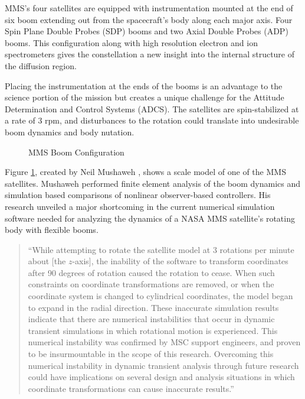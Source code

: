MMS's four satellites are equipped with instrumentation mounted at the end of six boom extending out from the spacecraft's body along each major axis.  Four Spin Plane Double Probes (SDP) booms and two Axial Double Probes (ADP) booms.  This configuration along with high resolution electron and ion spectrometers gives the constellation a new insight into the internal structure of the diffusion region.

Placing the instrumentation at the ends of the booms is an advantage to the science portion of the mission but creates a unique challenge for the Attitude Determination and Control Systems (ADCS).  The satellites are spin-stabilized at a rate of 3 rpm, and disturbances to the rotation could translate into undesirable boom dynamics and body nutation.

\begin{figure}[H]
  \centerline{}
  \caption{MMS Boom Configuration \cite{mushawehthesis}}
  \label{fig:booms}
\end{figure}

Figure \ref{fig:booms}, created by Neil Mushaweh \cite{mushawehthesis}, shows a scale model of one of the MMS satellites.  Mushaweh performed finite element analysis of the boom dynamics and simulation based comparisons of nonlinear observer-based controllers.  His research unveiled a major shortcoming in the current numerical simulation software needed for analyzing the dynamics of a NASA MMS satellite's rotating body with flexible booms.

\begin{quote}{``While attempting to rotate the satellite model at 3 rotations per minute about [the $z$-axis], the inability of the software to transform coordinates after 90 degrees of rotation caused the rotation to cease. When such constraints on coordinate transformations are removed, or when the coordinate system is changed to cylindrical coordinates, the model began to expand in the radial direction. These inaccurate simulation results indicate that there are numerical instabilities that occur in dynamic transient simulations in which rotational motion is experienced. This numerical instability was confirmed by MSC support engineers, and proven to be insurmountable in the scope of this research. Overcoming this numerical instability in dynamic transient analysis through future research could have implications on several design and analysis situations in which coordinate transformations can cause inaccurate results.''~\cite{mushawehthesis}}\end{quote}


